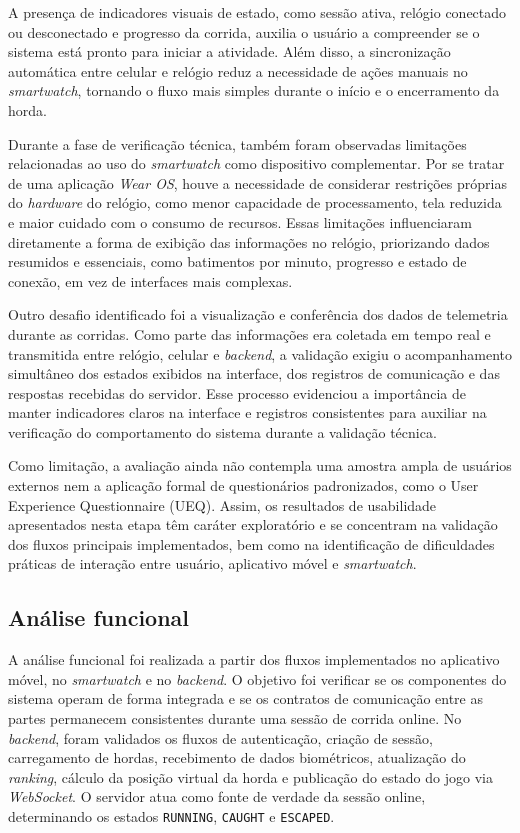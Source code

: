 A presença de indicadores visuais de estado, como sessão ativa, relógio conectado ou desconectado e progresso da corrida, auxilia o usuário a compreender se o sistema está pronto para iniciar a atividade. Além disso, a sincronização automática entre celular e relógio reduz a necessidade de ações manuais no \textit{smartwatch}, tornando o fluxo mais simples durante o início e o encerramento da horda.

Durante a fase de verificação técnica, também foram observadas limitações relacionadas ao uso do \textit{smartwatch} como dispositivo complementar. Por se tratar de uma aplicação \textit{Wear OS}, houve a necessidade de considerar restrições próprias do \textit{hardware} do relógio, como menor capacidade de processamento, tela reduzida e maior cuidado com o consumo de recursos. Essas limitações influenciaram diretamente a forma de exibição das informações no relógio, priorizando dados resumidos e essenciais, como batimentos por minuto, progresso e estado de conexão, em vez de interfaces mais complexas.

Outro desafio identificado foi a visualização e conferência dos dados de telemetria durante as corridas. Como parte das informações era coletada em tempo real e transmitida entre relógio, celular e \textit{backend}, a validação exigiu o acompanhamento simultâneo dos estados exibidos na interface, dos registros de comunicação e das respostas recebidas do servidor. Esse processo evidenciou a importância de manter indicadores claros na interface e registros consistentes para auxiliar na verificação do comportamento do sistema durante a validação técnica.

Como limitação, a avaliação ainda não contempla uma amostra ampla de usuários externos nem a aplicação formal de questionários padronizados, como o User Experience Questionnaire (UEQ). Assim, os resultados de usabilidade apresentados nesta etapa têm caráter exploratório e se concentram na validação dos fluxos principais implementados, bem como na identificação de dificuldades práticas de interação entre usuário, aplicativo móvel e \textit{smartwatch}.

\subsection{Análise funcional}

A análise funcional foi realizada a partir dos fluxos implementados no aplicativo móvel, no \textit{smartwatch} e no \textit{backend}. O objetivo foi verificar se os componentes do sistema operam de forma integrada e se os contratos de comunicação entre as partes permanecem consistentes durante uma sessão de corrida online. No \textit{backend}, foram validados os fluxos de autenticação, criação de sessão, carregamento de hordas, recebimento de dados biométricos, atualização do \textit{ranking}, cálculo da posição virtual da horda e publicação do estado do jogo via \textit{WebSocket}. O servidor atua como fonte de verdade da sessão online, determinando os estados \texttt{RUNNING}, \texttt{CAUGHT} e \texttt{ESCAPED}.

